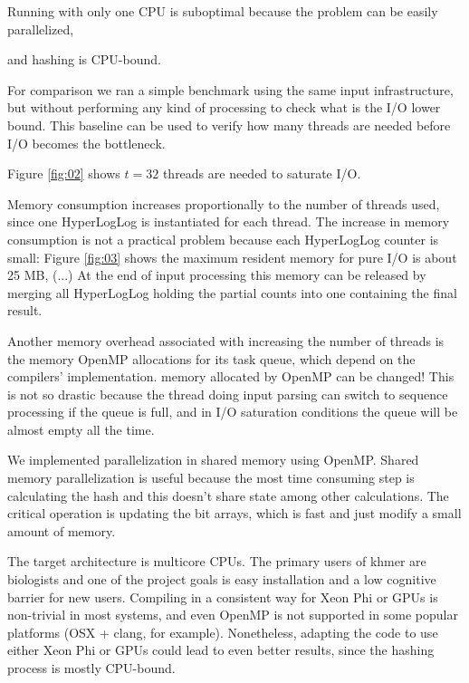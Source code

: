 \documentclass{bioinfo}
\begin{document}

Running with only one CPU is suboptimal because the problem can be easily parallelized,

and hashing is CPU-bound.

For comparison we ran a simple benchmark using the same input infrastructure,
but without performing any kind of processing to check what is the I/O lower bound.
This baseline can be used to verify how many threads are needed before I/O becomes the bottleneck.

Figure \ref{fig:02} shows $t=32$ threads are needed to saturate I/O.



Memory consumption increases proportionally to the number of threads
used, since one HyperLogLog is instantiated for each thread.  The
increase in memory consumption is not a practical problem because each
HyperLogLog counter is small: Figure \ref{fig:03} shows the maximum
resident memory for pure I/O is about 25 MB, (...)  At the end of
input processing this memory can be released by merging all
HyperLogLog holding the partial counts into one containing the final
result.

Another memory overhead associated with increasing the number of
threads is the memory OpenMP allocations for its task queue, which
depend on the compilers' implementation.  %
memory allocated by OpenMP can be changed!  This is not so drastic
because the thread doing input parsing can switch to sequence
processing if the queue is full, and in I/O saturation conditions the
queue will be almost empty all the time.




We implemented parallelization in shared memory using OpenMP.
Shared memory parallelization is useful because the most time consuming
step is calculating the hash and this doesn't share state among other calculations.
The critical operation is updating the bit arrays,
which is fast and just modify a small amount of memory.

The target architecture is multicore CPUs.
The primary users of khmer are biologists and one of the project goals is easy installation and a low cognitive barrier for new users.
Compiling in a consistent way for Xeon Phi or GPUs is non-trivial in most systems,
and even OpenMP is not supported in some popular platforms (OSX + clang, for example).
Nonetheless,
adapting the code to use either Xeon Phi or GPUs could lead to even better results,
since the hashing process is mostly CPU-bound.
\end{document}
